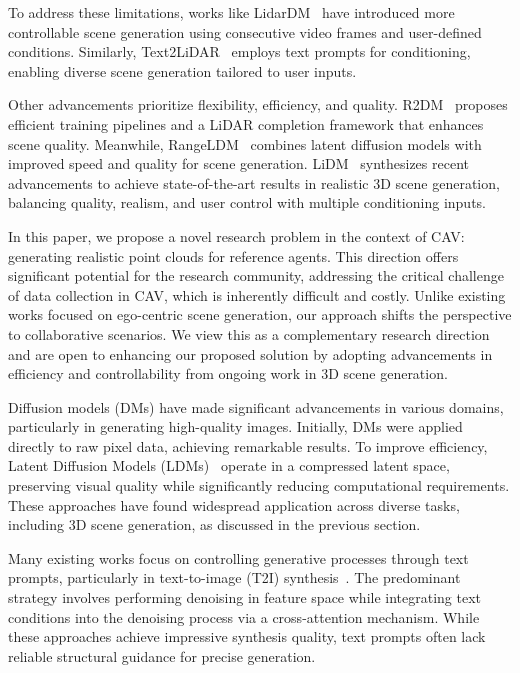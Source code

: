 To address these limitations, works like LidarDM~\citep{zyrianov2024lidardm} have introduced more controllable scene generation using consecutive video frames and user-defined conditions. Similarly, Text2LiDAR~\citep{wu2024text2lidar} employs text prompts for conditioning, enabling diverse scene generation tailored to user inputs.

Other advancements prioritize flexibility, efficiency, and quality. R2DM~\citep{nakashima2024lidar-r2dm} proposes efficient training pipelines and a LiDAR completion framework that enhances scene quality. Meanwhile, RangeLDM~\citep{hu2025rangeldm} combines latent diffusion models with improved speed and quality for scene generation. LiDM~\citep{ran2024towards} synthesizes recent advancements to achieve state-of-the-art results in realistic 3D scene generation, balancing quality, realism, and user control with multiple conditioning inputs.

In this paper, we propose a novel research problem in the context of CAV: generating realistic point clouds for reference agents. This direction offers significant potential for the research community, addressing the critical challenge of data collection in CAV, which is inherently difficult and costly. Unlike existing works focused on ego-centric scene generation, our approach shifts the perspective to collaborative scenarios. We view this as a complementary research direction and are open to enhancing our proposed solution by adopting advancements in efficiency and controllability from ongoing work in 3D scene generation. 


Diffusion models (DMs)\citep{sohl2015deep} have made significant advancements in various domains, particularly in generating high-quality images. Initially, DMs were applied directly to raw pixel data, achieving remarkable results\citep{dhariwal2021diffusion, ho2020denoising, kingma2021variational}. To improve efficiency, Latent Diffusion Models (LDMs)~\citep{rombach2022high} operate in a compressed latent space, preserving visual quality while significantly reducing computational requirements. These approaches have found widespread application across diverse tasks, including 3D scene generation, as discussed in the previous section.


 Many existing works focus on controlling generative processes through text prompts, particularly in text-to-image (T2I) synthesis~\citep{nichol2022glide,ramesh2021zero,ding2021cogview,gafni2022make,rombach2022high,saharia2022photorealistic}. The predominant strategy involves performing denoising in feature space while integrating text conditions into the denoising process via a cross-attention mechanism. While these approaches achieve impressive synthesis quality, text prompts often lack reliable structural guidance for precise generation.

